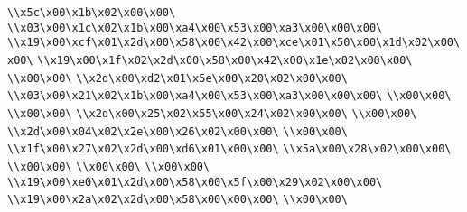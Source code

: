 \verb|\\x5c\x00\x1b\x02\x00\x00\|\newline
\verb|\\x03\x00\x1c\x02\x1b\x00\xa4\x00\x53\x00\xa3\x00\x00\x00\|\newline
\verb|\\x19\x00\xcf\x01\x2d\x00\x58\x00\x42\x00\xce\x01\x50\x00\x1d\x02\x00\x00\|\newline
\verb|\\x19\x00\x1f\x02\x2d\x00\x58\x00\x42\x00\x1e\x02\x00\x00\|\newline
\verb|\\x00\x00\|\newline
\verb|\\x2d\x00\xd2\x01\x5e\x00\x20\x02\x00\x00\|\newline
\verb|\\x03\x00\x21\x02\x1b\x00\xa4\x00\x53\x00\xa3\x00\x00\x00\|\newline
\verb|\\x00\x00\|\newline
\verb|\\x00\x00\|\newline
\verb|\\x2d\x00\x25\x02\x55\x00\x24\x02\x00\x00\|\newline
\verb|\\x00\x00\|\newline
\verb|\\x2d\x00\x04\x02\x2e\x00\x26\x02\x00\x00\|\newline
\verb|\\x00\x00\|\newline
\verb|\\x1f\x00\x27\x02\x2d\x00\xd6\x01\x00\x00\|\newline
\verb|\\x5a\x00\x28\x02\x00\x00\|\newline
\verb|\\x00\x00\|\newline
\verb|\\x00\x00\|\newline
\verb|\\x00\x00\|\newline
\verb|\\x19\x00\xe0\x01\x2d\x00\x58\x00\x5f\x00\x29\x02\x00\x00\|\newline
\verb|\\x19\x00\x2a\x02\x2d\x00\x58\x00\x00\x00\|\newline
\verb|\\x00\x00\|\newline
